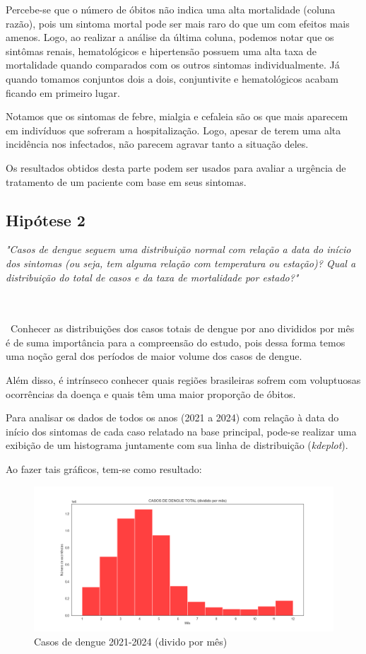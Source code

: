 \documentclass[a4paper,12pt]{article}
\begin{document}
Percebe-se que o número de óbitos não indica uma alta mortalidade (coluna razão), pois um sintoma mortal pode ser mais raro do que um com efeitos mais amenos. Logo, ao realizar a análise da última coluna, podemos notar que os sintômas renais, hematológicos e hipertensão possuem uma alta taxa de mortalidade quando comparados com os outros sintomas individualmente. Já quando tomamos conjuntos dois a dois, conjuntivite e hematológicos acabam ficando em primeiro lugar.

Notamos que os sintomas de febre, mialgia e cefaleia são os que mais aparecem em indivíduos que sofreram a hospitalização. Logo, apesar de terem uma alta incidência nos infectados, não parecem agravar tanto a situação deles.

Os resultados obtidos desta parte podem ser usados para avaliar a urgência de tratamento de um paciente com base em seus sintomas. 



\subsection{Hipótese 2}
\emph{"Casos de dengue seguem uma distribuição normal com relação a data do início dos sintomas (ou seja, tem alguma relação com temperatura ou estação)? Qual a distribuição do total de casos e da taxa de mortalidade por estado?"}

\\\\\
Conhecer as distribuições dos casos totais de dengue por ano divididos por mês é de suma importância para a compreensão do estudo, pois dessa forma temos uma noção geral dos períodos de maior volume dos casos de dengue.

Além disso, é intrínseco conhecer quais regiões brasileiras sofrem com voluptuosas ocorrências da doença e quais têm uma maior proporção de óbitos.

Para analisar os dados de todos os anos (2021 a 2024) com relação à data do início dos sintomas de cada caso relatado na base principal, pode-se realizar uma exibição de um histograma juntamente com sua linha de distribuição (\emph{kdeplot}).

Ao fazer tais gráficos, tem-se como resultado:

\begin{figure}[H]
    \centering
    \includegraphics[width=1.0\textwidth]{images/By month total.png}
    \caption{Casos de dengue 2021-2024 (divido por mês)}
    \label{fig:by_month_total}
\end{figure}
\end{document}
